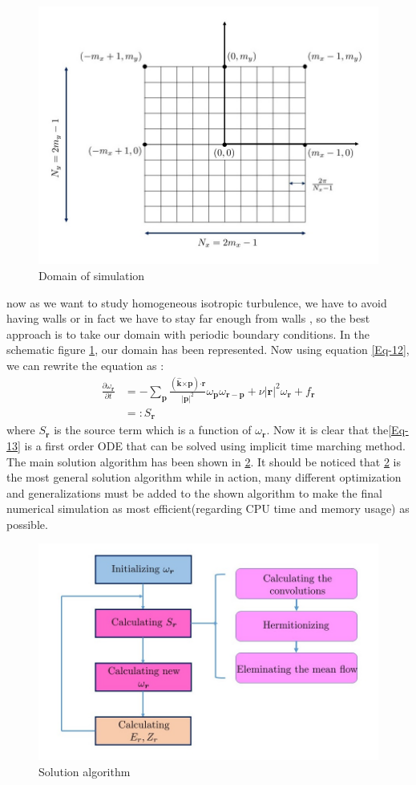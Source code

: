 \documentclass[10pt]{article}
\def\dotp{\bm{\cdot}}
\def\crossp{\bm{\times}}
\def\p{\bm{p}}
\def\r{\bm{r}}
\def\eK{\bm{\hat{k}}}
\begin{document}
%
\begin{figure}
\centering
\includegraphics[scale=0.5]{domain}
\caption{Domain of simulation}\label{Fig-1}
\end{figure}
%
now as we want to study homogeneous isotropic turbulence, we have to avoid having walls or in fact we have to stay far enough from walls , so the best approach is to take our domain with periodic boundary conditions. In the schematic figure \ref{Fig-1}, our domain has been represented. Now using equation \eqref{Eq-12}, we can rewrite the equation as :
%
\begin{align}
\frac{\partial\omega_{\r}}{\partial t} &= -\sum_{\p}{\frac{(\eK\crossp\p)\dotp\r}{|\p|^2}\omega_{\p}\omega_{\r-\p}}+\nu{|\r|}^2\omega_{\r} + f_{\r} \tag*{} \\
&=: S_{\r}\label{Eq-13}
\end{align}
%
where $S_{\r}$ is the source term which is a function of $\omega_{\r}$. Now it is clear that the\eqref{Eq-13} is a first order ODE that can be solved using implicit time marching method. The main solution algorithm has been shown in \ref{Fig-2}. It should be noticed that \ref{Fig-2} is the most general solution algorithm while in action, many different optimization and generalizations must be added to the shown algorithm to make the final numerical simulation as most efficient(regarding CPU time and memory usage) as possible.
%
\begin{figure}
\centering
\includegraphics[scale=0.5]{algorithm}
\caption{Solution algorithm}\label{Fig-2}
\end{figure}
%
\end{document}
